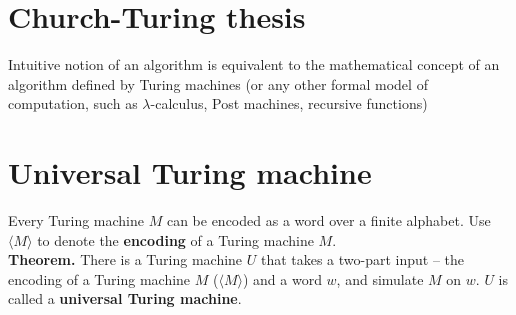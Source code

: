 \documentclass{article}
\begin{document}
\section{Church-Turing thesis}
Intuitive notion of an algorithm is equivalent to the mathematical concept of an algorithm defined by Turing machines (or any other formal model of computation, such as $\lambda$-calculus, Post machines, recursive functions)

\section{Universal Turing machine}
Every Turing machine $M$ can be encoded as a word over a finite alphabet. Use $\langle M\rangle$ to denote the \textbf{encoding} of a Turing machine $M$.\medskip
\\\textbf{Theorem.} There is a Turing machine $U$ that takes a two-part input -- the encoding of a Turing machine $M$ ($\langle M \rangle$) and a word $w$, and simulate $M$ on $w$. $U$ is called a \textbf{universal Turing machine}.
\end{document}
